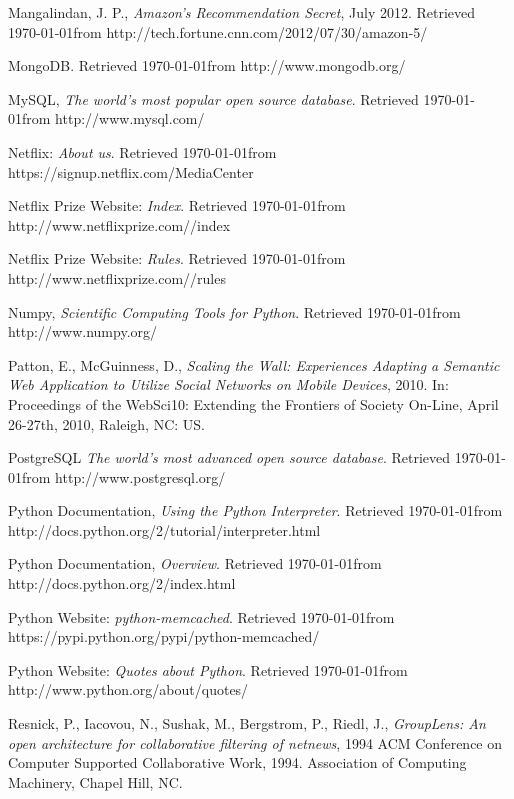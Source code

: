 \begin{thebibliography}{9}
     Mangalindan, J. P., \emph{Amazon's Recommendation Secret}, July 2012. Retrieved \today from http://tech.fortune.cnn.com/2012/07/30/amazon-5/

     MongoDB. Retrieved \today from http://www.mongodb.org/

     MySQL, \emph{The world's most popular open source database}. Retrieved \today from http://www.mysql.com/

     Netflix: \emph{About us}. Retrieved \today from https://signup.netflix.com/MediaCenter

     Netflix Prize Website: \emph{Index}.  Retrieved \today from http://www.netflixprize.com//index

     Netflix Prize Website: \emph{Rules}.  Retrieved \today from http://www.netflixprize.com//rules

     Numpy, \emph{Scientific Computing Tools for Python}. Retrieved \today from http://www.numpy.org/

     Patton, E., McGuinness, D., \emph{Scaling the Wall: Experiences Adapting a Semantic Web Application to Utilize Social Networks on Mobile Devices}, 2010. In: Proceedings of the WebSci10: Extending the Frontiers of Society On-Line, April 26-27th, 2010, Raleigh, NC: US.

     PostgreSQL \emph{The world's most advanced open source database}. Retrieved \today from http://www.postgresql.org/

     Python Documentation, \emph{Using the Python Interpreter}. Retrieved \today from http://docs.python.org/2/tutorial/interpreter.html

     Python Documentation, \emph{Overview}. Retrieved \today from http://docs.python.org/2/index.html

     Python Website: \emph{python-memcached}. Retrieved \today from https://pypi.python.org/pypi/python-memcached/

     Python Website: \emph{Quotes about Python}. Retrieved \today from http://www.python.org/about/quotes/

     Resnick, P., Iacovou, N., Sushak, M., Bergstrom, P., Riedl, J., \emph{GroupLens: An open architecture for collaborative filtering of netnews}, 1994 ACM Conference on Computer Supported Collaborative Work, 1994. Association of Computing Machinery, Chapel Hill, NC.


\end{thebibliography}
